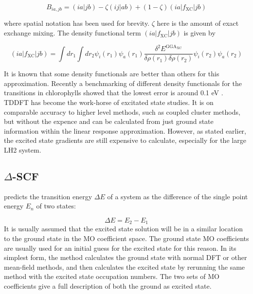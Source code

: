 \begin{equation}
B_{ia, jb} = \left(ia|jb\right) - \zeta\left(ij|ab\right) + \left(1-\zeta\right)\left(ia|f_{\text{XC}}|jb\right)
\end{equation}

where spatial notation has been used for brevity. $\zeta$ here is the amount of 
exact exchange mixing. The density functional term $\left(ia|f_{\text{XC}}|jb\right)$ 
is given by

\begin{equation}
\left(ia|f_{\text{XC}}|jb\right) = \int dr_1 \int dr_2 \psi_i \left(r_1\right)\psi_a \left(r_1\right) \frac{\delta^2 E^{\text{GGA}_{\text{XC}}}}{\delta\rho\left(r_1\right)\delta\rho\left(r_2\right)} \psi_i \left(r_2\right)\psi_a \left(r_2\right)
\end{equation}

It is known that some density functionals are better than others for this approximation. 
Recently a benchmarking of different density functionals for the \Qy transitions 
in chlorophylls showed that the lowest error is around 0.1 eV \cite{List2013}. TDDFT 
has become the work-horse of excitated state studies. It is on comparable accuracy 
to higher level methods, such as coupled cluster methods, but without the expence\cite{Laurent2013} 
and can be calculated from just ground state information within the linear response 
approximation. However, as stated earlier, the excited state gradients are still 
expensive to calculate, especially for the large LH2 system.

\subsection{$\Delta$-SCF}
\label{subsec{dscf_and_eigdiff}}

\dscf predicts the transition energy $\Delta E$ of a system as the difference of
the single point energy $E_n$ of two states:

\begin{equation}
\Delta E = E_{2} - E_{1}
\end{equation}
%
It is usually assumed that the excited state solution will be in a similar
location to the ground state in the MO coefficient space. The ground state MO 
coefficients are usually used for an initial guess for the excited
state for this reason. In its simplest form, the \dscf method calculates
the ground state with normal DFT or other mean-field methods, and
then calculates the excited state by rerunning the same method with the excited
state occupation numbers. The two sets of MO coefficients give a full description
of both the ground as excited state.

